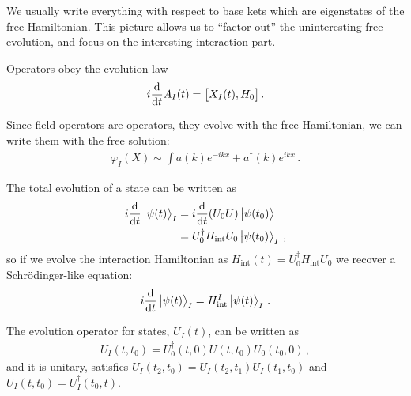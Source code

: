 \documentclass[main.tex]{subfiles}
\begin{document}
We usually write everything with respect to base kets which are eigenstates of the free Hamiltonian. 
This picture allows us to ``factor out'' the uninteresting free evolution, and focus on the interesting interaction part. 

Operators obey the evolution law 
%
\begin{align}
i \dv{}{t} A_I (t) = \qty[X_I(t), H_0 ]
\,.
\end{align}

Since field operators are operators, they evolve with the free Hamiltonian, we can write them with the free solution: 
%
\begin{align}
\varphi_{I} (X) \sim \int a(k) e^{-ikx} + a ^\dag(k) e^{ikx}
\,.
\end{align}

The total evolution of a state can be written as 
%
\begin{subequations}
\begin{align}
i \dv{}{t} \ket{\psi (t)}_{I} &= i \dv{}{t} \qty(U_0 U) \ket{\psi (t_0 )} \\
&= U_0 ^\dag H _{\text{int}} U_0 \ket{\psi (t_0 )}_{I}
\,,
\end{align}
\end{subequations}
%
so if we evolve the interaction Hamiltonian as \(H _{\text{int}} (t) = U_0 ^\dag H _{\text{int}} U_0 \) we recover a Schrödinger-like equation: 
%
\begin{align}
i \dv{}{t} \ket{\psi (t)}_{I} = H _{\text{int}}^{I} \ket{\psi (t)}_{I}
\,.
\end{align}

\begin{claim}
The evolution operator for states, \(U_I (t)\), can be written as 
%
\begin{align}
U_I (t, t_0 ) = U_0^\dag(t,0)  U (t, t_0 ) U_0 (t_0, 0) 
\,,
\end{align}
%
and it is unitary, satisfies \(U_{I}(t_2, t_0 ) = U_I (t_2 , t_1 ) U_I (t_1 , t_0 )\) and \(U_I (t, t_0 ) = U ^\dag_I (t_0, t)\).  
\end{claim}

\end{document}

